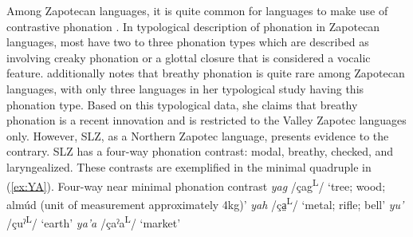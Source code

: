 \documentclass[12pt, letterpaper]{article}
\newcommand{\supr}[1]{\textsuperscript{#1}}
\begin{document}
Among Zapotecan languages, it is quite common for languages to make use of contrastive phonation \citep[e.g.,][]{avelinobecerraTopicsYalalagZapotec2004,longDiccionarioZapotecoSan2005,avelinoAcousticElectroglottographicAnalyses2010,lopeznicolasEstudiosFonologiaGramatica2016,chavez-peonInteractionMetricalStructure2010}. In  typological description of phonation in Zapotecan languages, most have two to three phonation types which are described as involving creaky phonation or a glottal closure that is considered a vocalic feature. \citet{ariza-garciaPhonationTypesTones2018} additionally notes that breathy phonation is quite rare among Zapotecan languages, with only three languages in her typological study having this phonation type. Based on this typological data, she claims that breathy phonation is a recent innovation and is restricted to the Valley Zapotec languages only. However, SLZ, as a Northern Zapotec language, presents evidence to the contrary. SLZ has a four-way phonation contrast: modal, breathy, checked, and laryngealized. These contrasts are exemplified in the minimal quadruple in (\ref{ex:YA}).
\ea \label{ex:YA} Four-way near minimal phonation contrast
    \ea \textit{yag}  /çag\supr{L}/ `tree; wood; almúd (unit of measurement approximately 4kg)'
    \ex \textit{yah}  /ça̤\supr{L}/ `metal; rifle; bell'
    \ex \textit{yu'}  /çuˀ\supr{L}/  `earth'
    \ex \textit{ya'a}  /çaˀa\supr{L}/  `market'
    \z 
\z 
\end{document}
